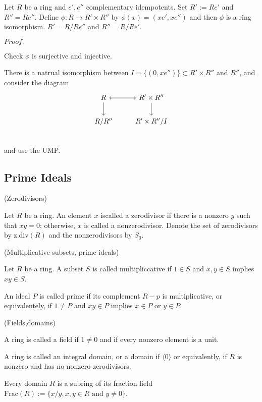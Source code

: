\documentclass{article}
\newcommand{\Pf}[1]{$Proof.$\par}
\begin{document}
\begin{proposition}
    Let $R$ be a ring and $e',e''$ complementary idempotents. Set $R' := Re'$ and $R'' = Re''$. Define $\phi:R\to R'\times R''$ by $\phi(x) = (xe',xe'')$ and then $\phi$ is a ring isomorphism. $R' = R/Re''$ and $R'' = R/Re'$.
\end{proposition}
\Pf\par
    Check $\phi$ is surjective and injective.\par
    There is a natrual isomorphism between $I = \{(0,xe'')\} \subset R'\times R''$ and $R''$, and consider the diagram
    \[
    \begin{tikzcd}
        R\arrow[r] \arrow[d]& R'\times R''\arrow[l]\arrow[d] \\
        R/R'' & R'\times R''/I \\
    \end{tikzcd}
    \]
    and use the UMP.

\subsection{Prime Ideals}

\begin{definition}
    (Zerodivisors)\par
    Let $R$ be a ring. An element $x$ iscalled a zerodivisor if there is a nonzero $y$ such that $xy = 0$; otherwise, $x$ is called a nonzerodivisor. Denote the set of zerodivisors by $\text{z.div}(R)$ and the nonzerodivisors by $S_0$.
\end{definition}

\begin{definition}
    (Multiplicative subsets, prime ideals)\par
    Let $R$ be a ring. A subset $S$ is called multipliccative if $1\in S$ and $x,y\in S$ implies $xy\in S$.\par
    An ideal $P$ is called prime if its complement $R-p$ is multiplicative, or equivalentely, if $1\neq P$ and $xy\in P$ implies $x\in P$ or $y\in P$.
\end{definition}

\begin{definition}
    (Fields,domains)\par
    A ring is called a field if $1\neq 0$ and if every nonzero element is a unit.\par
    A ring is called an integral domain, or a domain if $\langle 0 \rangle$ or equivalently, if $R$ is nonzero and has no nonzero zerodivisors.\par
    Every domain $R$ is a subring of its fraction field $\text{Frac}(R):=\{x/y, x,y\in R\text{ and }y\neq 0\}$.
\end{definition}
\end{document}
